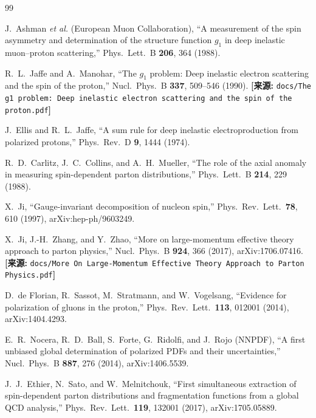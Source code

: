 \documentclass[12pt,a4paper]{ctexart}
\theoremstyle{definition}
\begin{document}
\begin{thebibliography}{99}


J.~Ashman \textit{et al.} (European Muon Collaboration),
``A measurement of the spin asymmetry and determination of the structure function $g_1$ in deep inelastic muon--proton scattering,''
Phys.\ Lett.\ B \textbf{206}, 364 (1988).

R.~L.~Jaffe and A.~Manohar,
``The $g_1$ problem: Deep inelastic electron scattering and the spin of the proton,''
Nucl.\ Phys.\ B \textbf{337}, 509--546 (1990).
\quad\textbf{[来源:} \texttt{docs/The g1 problem: Deep inelastic electron scattering and the spin of the proton.pdf}\textbf{]}

J.~Ellis and R.~L.~Jaffe,
``A sum rule for deep inelastic electroproduction from polarized protons,''
Phys.\ Rev.\ D \textbf{9}, 1444 (1974).

R.~D.~Carlitz, J.~C.~Collins, and A.~H.~Mueller,
``The role of the axial anomaly in measuring spin-dependent parton distributions,''
Phys.\ Lett.\ B \textbf{214}, 229 (1988).


X.~Ji,
``Gauge-invariant decomposition of nucleon spin,''
Phys.\ Rev.\ Lett.\ \textbf{78}, 610 (1997), arXiv:hep-ph/9603249.

X.~Ji, J.-H.~Zhang, and Y.~Zhao,
``More on large-momentum effective theory approach to parton physics,''
Nucl.\ Phys.\ B \textbf{924}, 366 (2017), arXiv:1706.07416.
\quad\textbf{[来源:} \texttt{docs/More On Large-Momentum Effective Theory Approach to Parton Physics.pdf}\textbf{]}


D.~de Florian, R.~Sassot, M.~Stratmann, and W.~Vogelsang,
``Evidence for polarization of gluons in the proton,''
Phys.\ Rev.\ Lett.\ \textbf{113}, 012001 (2014), arXiv:1404.4293.

E.~R.~Nocera, R.~D.~Ball, S.~Forte, G.~Ridolfi, and J.~Rojo (NNPDF),
``A first unbiased global determination of polarized PDFs and their uncertainties,''
Nucl.\ Phys.\ B \textbf{887}, 276 (2014), arXiv:1406.5539.

J.~J.~Ethier, N.~Sato, and W.~Melnitchouk,
``First simultaneous extraction of spin-dependent parton distributions and fragmentation functions from a global QCD analysis,''
Phys.\ Rev.\ Lett.\ \textbf{119}, 132001 (2017), arXiv:1705.05889.


\end{thebibliography}
\end{document}
